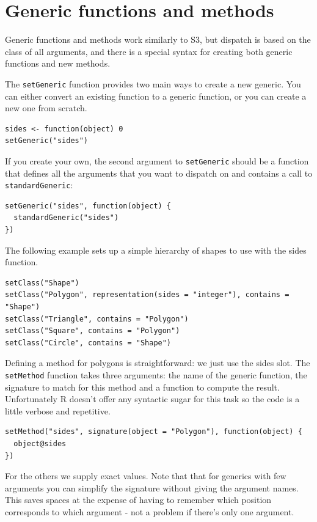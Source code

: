 \section{Generic functions and methods}

Generic functions and methods work similarly to S3, but dispatch is
based on the class of all arguments, and there is a special syntax for
creating both generic functions and new methods.

The \texttt{setGeneric} function provides two main ways to create a new
generic. You can either convert an existing function to a generic
function, or you can create a new one from scratch.

\begin{verbatim}
sides <- function(object) 0
setGeneric("sides")
\end{verbatim}

If you create your own, the second argument to \texttt{setGeneric}
should be a function that defines all the arguments that you want to
dispatch on and contains a call to \texttt{standardGeneric}:

\begin{verbatim}
setGeneric("sides", function(object) {
  standardGeneric("sides")
})
\end{verbatim}

The following example sets up a simple hierarchy of shapes to use with
the sides function.

\begin{verbatim}
setClass("Shape")
setClass("Polygon", representation(sides = "integer"), contains = "Shape")
setClass("Triangle", contains = "Polygon")
setClass("Square", contains = "Polygon")
setClass("Circle", contains = "Shape")
\end{verbatim}

Defining a method for polygons is straightforward: we just use the sides
slot. The \texttt{setMethod} function takes three arguments: the name of
the generic function, the signature to match for this method and a
function to compute the result. Unfortunately R doesn't offer any
syntactic sugar for this task so the code is a little verbose and
repetitive.

\begin{verbatim}
setMethod("sides", signature(object = "Polygon"), function(object) {
  object@sides
})
\end{verbatim}

For the others we supply exact values. Note that that for generics with
few arguments you can simplify the signature without giving the argument
names. This saves spaces at the expense of having to remember which
position corresponds to which argument - not a problem if there's only
one argument.


